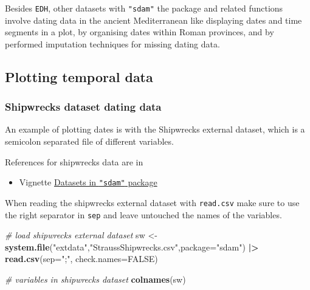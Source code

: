 \documentclass[a4paper,11pt]{memoir}
\newenvironment{Shaded}{\begin{snugshade}}{\end{snugshade}}
\newcommand{\CommentTok}[1]{\textcolor[rgb]{0.56,0.35,0.01}{\textit{#1}}}
\newcommand{\DataTypeTok}[1]{\textcolor[rgb]{0.13,0.29,0.53}{#1}}
\newcommand{\ErrorTok}[1]{\textcolor[rgb]{0.64,0.00,0.00}{\textbf{#1}}}
\newcommand{\KeywordTok}[1]{\textcolor[rgb]{0.13,0.29,0.53}{\textbf{#1}}}
\newcommand{\NormalTok}[1]{#1}
\newcommand{\OperatorTok}[1]{\textcolor[rgb]{0.81,0.36,0.00}{\textbf{#1}}}
\newcommand{\OtherTok}[1]{\textcolor[rgb]{0.56,0.35,0.01}{#1}}
\newcommand{\StringTok}[1]{\textcolor[rgb]{0.31,0.60,0.02}{#1}}
\providecommand{\tightlist}{%
  \setlength{\itemsep}{0pt}\setlength{\parskip}{0pt}}
\begin{document}
Besides \texttt{EDH}, other datasets with \texttt{"sdam"} the package
and related functions involve dating data in the ancient Mediterranean
like displaying dates and time segments in a plot, by organising dates
within Roman provinces, and by performed imputation techniques for
missing dating data.

\hypertarget{plotting-temporal-data}{%
\subsection{Plotting temporal data}\label{plotting-temporal-data}}

\hypertarget{shipwrecks-dataset-dating-data}{%
\subsubsection{Shipwrecks dataset dating
data}\label{shipwrecks-dataset-dating-data}}

An example of plotting dates is with the Shipwrecks external dataset,
which is a semicolon separated file of different variables.

References for shipwrecks data are in

\begin{itemize}
\tightlist
\item
  Vignette \href{../doc/Intro.html}{Datasets in \texttt{"sdam"} package}
\end{itemize}

When reading the shipwrecks external dataset with \texttt{read.csv} make
sure to use the right separator in \texttt{sep} and leave untouched the
names of the variables.

\begin{Shaded}
\begin{Highlighting}[]
\CommentTok{# load shipwrecks external dataset}
\NormalTok{sw <-}\StringTok{ }\KeywordTok{system.file}\NormalTok{(}\StringTok{"extdata"}\NormalTok{,}\StringTok{"StraussShipwrecks.csv"}\NormalTok{,}\DataTypeTok{package=}\StringTok{"sdam"}\NormalTok{) }\OperatorTok{|}\ErrorTok{>}\StringTok{ }
\StringTok{  }\KeywordTok{read.csv}\NormalTok{(}\DataTypeTok{sep=}\StringTok{";"}\NormalTok{, }\DataTypeTok{check.names=}\OtherTok{FALSE}\NormalTok{)}
\end{Highlighting}
\end{Shaded}

\begin{Shaded}
\begin{Highlighting}[]
\CommentTok{# variables in shipwrecks dataset}
\KeywordTok{colnames}\NormalTok{(sw)}
\end{Highlighting}
\end{Shaded}
\end{document}
